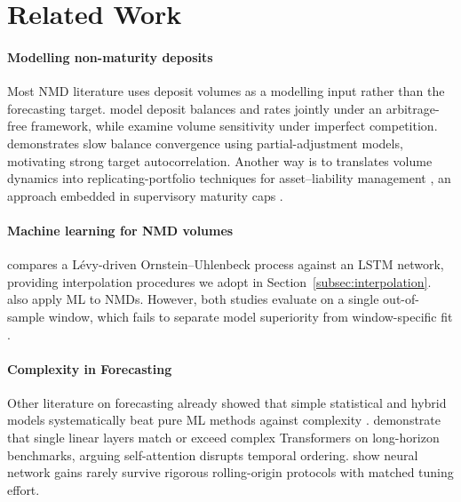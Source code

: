 \documentclass[11pt,a4paper]{article}
\begin{document}
\section{Related Work}
\label{sec:related_work}

\paragraph{Modelling non-maturity deposits}
Most NMD literature uses deposit volumes as a modelling input rather than the forecasting target. \citet{jarrow1998} model deposit balances and rates jointly under an
arbitrage-free framework, while \citet{hutchison1996} examine volume
sensitivity under imperfect competition. \citet{obrien2000} demonstrates slow
balance convergence using partial-adjustment models, motivating strong target
autocorrelation. Another way is to translates volume dynamics into
replicating-portfolio techniques for asset--liability management
\citep{frauendorfer2003, kalkbrener2004, blochlinger2015, nystrom2008}, an
approach embedded in supervisory maturity caps \citep{bcbs2016irrbb,
eba2022irrbb}.

\paragraph{Machine learning for NMD volumes}
\citet{winkler2025} compares a L\'evy-driven
Ornstein--Uhlenbeck process against an LSTM network, providing interpolation
procedures we adopt in Section~\ref{subsec:interpolation}.
\citet{marena2022nonmaturing} also apply ML to NMDs. However, both studies
evaluate on a single out-of-sample window, which fails to separate
model superiority from window-specific fit \citep{hewamalage2021}.

\paragraph{Complexity in Forecasting}
Other literature on forecasting already showed that simple statistical and hybrid models systematically beat pure ML methods against complexity \citep{makridakis2020m4, makridakis2022m5}.
\citet{zeng2023transformers} demonstrate that single linear layers match or
exceed complex Transformers on long-horizon benchmarks, arguing self-attention
disrupts temporal ordering. \citet{hewamalage2021} show neural network gains
rarely survive rigorous rolling-origin protocols with matched tuning effort.
\end{document}
